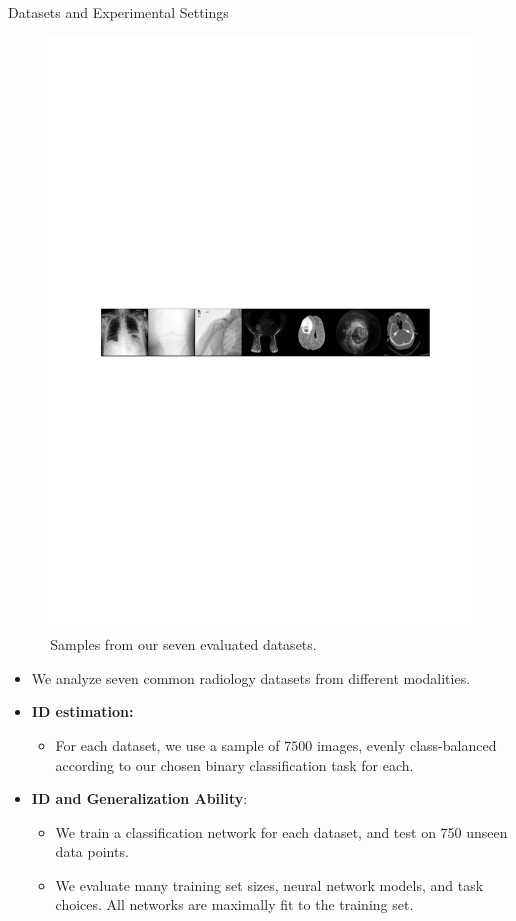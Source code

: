 \documentclass[final,hyperref={pdfpagelabels=false}]{beamer}
\begin{document}
\begin{frame}[t]
\begin{columns}[t]
\begin{column}{.3\textwidth}
\begin{block}{Datasets and Experimental Settings}
\begin{figure}
    \includegraphics[width=0.95\linewidth]{frompaper/data_eg_1row.pdf}
     \caption{\,Samples from our seven evaluated datasets.}
\end{figure}


\begin{itemize}
\item We analyze seven common radiology datasets from different modalities.
\item \textbf{ID estimation:}
\begin{itemize}
    \item For each dataset, we use a sample of $7500$ images, evenly class-balanced according to our chosen binary classification task for each.
\end{itemize}
\item \textbf{ID and Generalization Ability}:
\begin{itemize}
    \item We train a classification network for each dataset, and test on 750 unseen data points.
    \item We evaluate many training set sizes, neural network models, and task choices. All networks are maximally fit to the training set.
\end{itemize}
\end{itemize}


\end{block}
\end{column}
\end{columns}
\end{frame}
\end{document}

